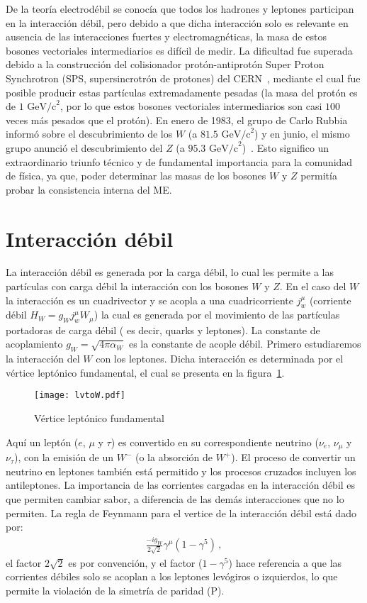 De la teoría electrodébil se conocía que todos los hadrones y leptones participan en la interacción débil, pero debido a que dicha interacción solo es relevante en ausencia de las interacciones fuertes y electromagnéticas, la masa de estos bosones vectoriales intermediarios es difícil de medir. La dificultad fue superada debido a la construcción del colisionador protón-antiprotón Super Proton Synchrotron (SPS, supersincrotrón de protones) del CERN~\cite{Arnison:1983mk, Arnison:1983rp}, mediante el cual fue posible producir estas partículas extremadamente pesadas (la masa del protón es de $1 \text{ GeV/c}^2$, por lo que estos bosones vectoriales intermediarios son casi $100$ veces más pesados que el protón). En enero de 1983, el grupo de Carlo Rubbia informó sobre el descubrimiento de los $W$ (a $81.5\text{ GeV/c}^2$) y en junio, el mismo grupo anunció el descubrimiento del $Z$ (a $95.3 \text{ GeV/c}^2$)~\cite{Rubbia:1984xy}. Esto significo un extraordinario triunfo técnico y de fundamental importancia para la comunidad de física, ya que, poder determinar las masas de los bosones $W$ y $Z$ permitía probar la consistencia interna del ME.

\section{Interacción débil}
La interacción débil es generada por la carga débil, lo cual les permite a las partículas con carga débil la interacción con los bosones $W$ y $Z$. En el caso del $W$ la interacción es un cuadrivector  y se acopla a una cuadricorriente $j^{\mu}_w$ (corriente débil $H_W = g_W j^{\mu}_w W_{\mu}$) la cual es generada por el movimiento de las partículas portadoras de carga débil ( es decir, quarks y leptones). La constante de acoplamiento $g_W=\sqrt{4\pi \alpha_W}$ es la constante de acople débil. Primero estudiaremos la interacción del $W$ con los leptones. Dicha interacción es determinada por el vértice leptónico fundamental, el cual se presenta en la figura~\ref{Fig:lvtoW}.
%
\begin{figure}
\centering
\texttt{[image: lvtoW.pdf]}
\caption{Vértice leptónico fundamental}
\label{Fig:lvtoW}
\end{figure}
%
Aquí un leptón ($e$, $\mu$ y $\tau$) es convertido en su correspondiente neutrino ($\nu_e$, $\nu_{\mu}$ y $\nu_{\tau}$), con la emisión de un $W^{-}$ (o la absorción de $W^{+}$). El proceso de convertir un neutrino en leptones también está permitido y los procesos cruzados incluyen los antileptones. La importancia de las corrientes cargadas en la interacción débil es que permiten cambiar sabor, a diferencia de las demás interacciones que no lo permiten. La regla de Feynmann para el vertice de la interacción débil está dado por:
%
\begin{align*}
\frac{-i g_{W}}{2\sqrt{2}} \gamma^{\mu}(1-\gamma^5)\,,
\end{align*}
%
el factor $2\sqrt{2}$ es por convención,  y el factor ($1-\gamma^5$) hace referencia a que las corrientes débiles solo se acoplan a los leptones levógiros o izquierdos, lo que permite la violación de la simetría de paridad (P).

